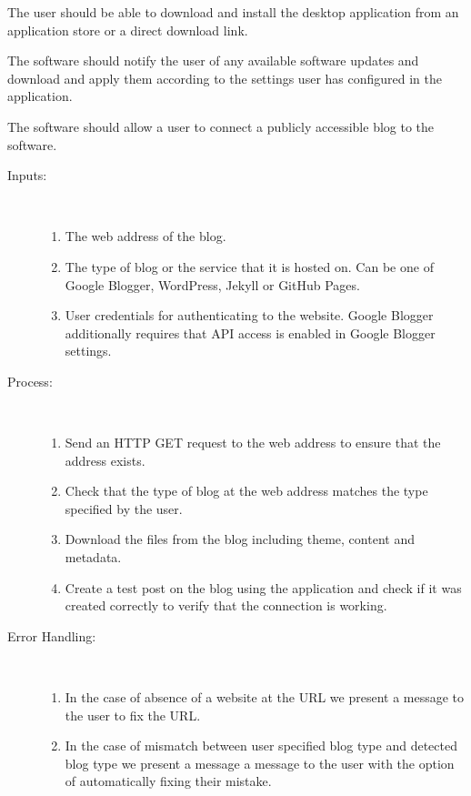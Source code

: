 
The user should be able to download and install the desktop application from an application store or a direct download
link.


The software should notify the user of any available software updates and download and apply them according to the
settings user has configured in the application.


The software should allow a user to connect a publicly accessible blog to the software.

\begin{description}
    \item [Inputs:] ~
    \begin{enumerate}[noitemsep]
        \item {The web address of the blog.}
        \item {The type of blog or the service that it is hosted on. Can be one of Google Blogger, WordPress, Jekyll or
               GitHub Pages.}
        \item {User credentials for authenticating to the website. Google Blogger additionally requires that API access
               is enabled in Google Blogger settings.}
    \end{enumerate}
    \item [Process:] ~
    \begin{enumerate}[noitemsep]
        \item {Send an HTTP GET request to the web address to ensure that the address exists.}
        \item {Check that the type of blog at the web address matches the type specified by the user.}
        \item {Download the files from the blog including theme, content and metadata.}
        \item {Create a test post on the blog using the application and check if it was created correctly to verify that
               the connection is working.}
    \end{enumerate}
    \item [Error Handling:] ~
        \begin{enumerate}[noitemsep]
        \item {In the case of absence of a website at the URL we present a message to the user to fix the URL.}
        \item {In the case of mismatch between user specified blog type and detected blog type we present a message a
               message to the user with the option of automatically fixing their mistake.}
    \end{enumerate}
\end{description}

